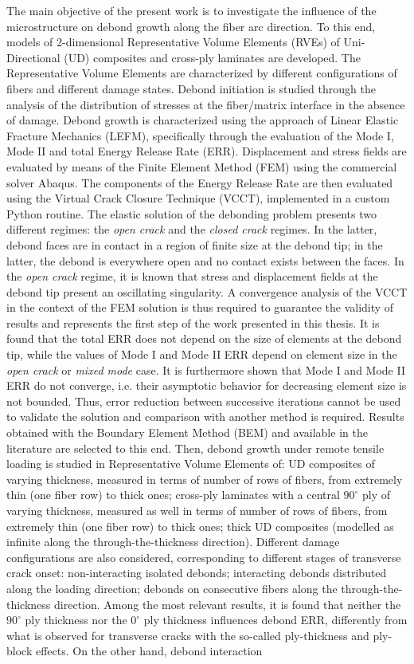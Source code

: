 The main objective of the present work is to investigate the influence of the microstructure on debond growth along the fiber arc direction. To this end, models of 2-dimensional Representative Volume Elements (RVEs) of Uni-Directional (UD) composites and cross-ply laminates are developed. The Representative Volume Elements are characterized by different configurations of fibers and different damage states. Debond initiation is studied through the analysis of the distribution of stresses at the fiber/matrix interface in the absence of damage. Debond growth is characterized using the approach of Linear Elastic Fracture Mechanics (LEFM), specifically through the evaluation of the Mode I, Mode II and total Energy Release Rate (ERR). Displacement and stress fields are evaluated by means of the Finite Element Method (FEM) using the commercial solver Abaqus. The components of the Energy Release Rate are then evaluated using the Virtual Crack Closure Technique (VCCT), implemented in a custom Python routine. The elastic solution of the debonding problem presents two different regimes: the \emph{open crack} and the \emph{closed crack} regimes. In the latter, debond faces are in contact in a region of finite size at the debond tip; in the latter, the debond is everywhere open and no contact exists between the faces. In the \emph{open crack} regime, it is known that stress and displacement fields at the debond tip present an oscillating singularity. A convergence analysis of the VCCT in the context of the FEM solution is thus required to guarantee the validity of results and represents the first step of the work presented in this thesis. It is found that the total ERR does not depend on the size of elements at the debond tip, while the values of Mode I and Mode II ERR depend on element size in the \emph{open crack} or \emph{mixed mode} case. It is furthermore shown that Mode I and Mode II ERR do not converge, i.e. their asymptotic behavior for decreasing element size is not bounded. Thus, error reduction between successive iterations cannot be used to validate the solution and comparison with another method is required. Results obtained with the Boundary Element Method (BEM) and available in the literature are selected to this end. Then, debond growth under remote tensile loading is studied in Representative Volume Elements of: UD composites of varying thickness, measured in terms of number of rows of fibers, from extremely thin (one fiber row) to thick ones; cross-ply laminates with a central $90^{\circ}$ ply of varying thickness, measured as well in terms of number of rows of fibers, from extremely thin (one fiber row) to thick ones; thick UD composites (modelled as infinite along the through-the-thickness direction). Different damage configurations are also considered, corresponding to different stages of transverse crack onset: non-interacting isolated debonds; interacting debonds distributed along the loading direction; debonds on consecutive fibers along the through-the-thickness direction. Among the most relevant results, it is found that neither the $90^{\circ}$ ply thickness nor the $0^{\circ}$ ply thickness influences debond ERR, differently from what is observed for transverse cracks with the so-called ply-thickness and ply-block effects. On the other hand, debond interaction 